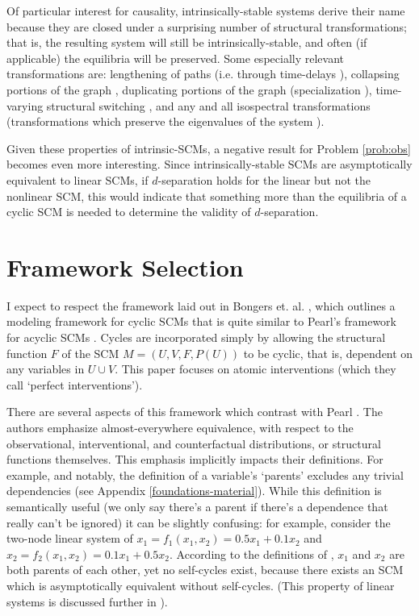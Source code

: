 \documentclass[letterpaper,10pt]{article}
\begin{document}
Of particular interest for causality, intrinsically-stable systems derive their name because they are closed under a surprising number of structural transformations; that is, the resulting system will still be intrinsically-stable, and often (if applicable) the equilibria will be preserved. Some especially relevant transformations are: lengthening of paths (i.e. through time-delays \cite{ReberIntrinsic}), collapsing portions of the graph \cite{IsospectralReduction}, duplicating portions of the graph (specialization \cite{Specialization}), time-varying structural switching \cite{Switched}, and any and all isospectral transformations (transformations which preserve the eigenvalues of the system \cite{IsospectralBook}).

Given these properties of intrinsic-SCMs, a negative result for Problem \ref{prob:obs} becomes even more interesting. Since intrinsically-stable SCMs are asymptotically equivalent to linear SCMs, if $d$-separation holds for the linear but not the nonlinear SCM, this would indicate that something more than the equilibria of a cyclic SCM is needed to determine the validity of $d$-separation. 


\section{Framework Selection}

I expect to respect the framework laid out in Bongers et. al. \cite{Foundations}, which outlines a modeling framework for cyclic SCMs that is quite similar to Pearl's framework for acyclic SCMs \cite{pearl_2009}.
Cycles are incorporated simply by allowing the structural function $F$ of the SCM $M=(U,V,F,P(U))$ to be cyclic, that is, dependent on any variables in $U\cup V$.
This paper focuses on atomic interventions (which they call `perfect interventions').

There are several aspects of this framework which contrast with Pearl \cite{pearl_2009}.
The authors emphasize almost-everywhere equivalence, with respect to the observational, interventional, and counterfactual distributions, or structural functions themselves. This emphasis implicitly impacts their definitions. For example, and notably, the definition of a variable's `parents' excludes any trivial dependencies (see Appendix \ref{foundations-material}). While this definition is semantically useful (we only say there's a parent if there's a dependence that really can't be ignored) it can be slightly confusing: for example, consider the two-node linear system of $x_1 = f_1(x_1,x_2)=0.5x_1+0.1x_2$ and $x_2 = f_2(x_1,x_2)=0.1x_1+0.5x_2$. According to the definitions of \cite{Foundations}, $x_1$ and $x_2$ are both parents of each other, yet no self-cycles exist, because there exists an SCM which is asymptotically equivalent without self-cycles. (This property of linear systems is discussed further in \cite{LearningLinear}).
\end{document}
